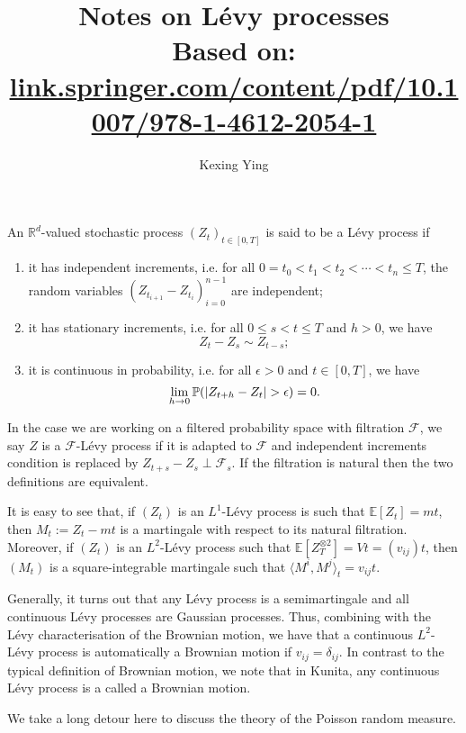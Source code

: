 \documentclass[]{article}
\title{Notes on L\'evy processes\\
  \large Based on: \href{link.springer.com/content/pdf/10.1007/978-1-4612-2054-1}{link.springer.com/content/pdf/10.1007/978-1-4612-2054-1}}
\author{Kexing Ying}
\theoremstyle{definition}
\theoremstyle{definition}
\begin{document}
\maketitle

An \(\mathbb{R}^d\)-valued stochastic process \((Z_t)_{t \in [0, T]}\) is said to be a L\'evy process 
if 
\begin{enumerate}
  \item it has independent increments, i.e. for all \(0 = t_0 < t_1 < t_2 < \cdots < t_n \leq T\), the 
    random variables \((Z_{t_{i + 1}} - Z_{t_i})_{i = 0}^{n - 1}\) are independent;
  \item it has stationary increments, i.e. for all \(0 \leq s < t \leq T\) and \(h > 0\), we have 
    \[Z_{t} - Z_{s} \sim Z_{t - s};\]
  \item it is continuous in probability, i.e. for all \(\epsilon > 0\) and \(t \in [0, T]\), we have 
    \[\lim_{h \to 0} \mathbb{P}(\abs{Z_{t + h} - Z_t} > \epsilon) = 0.\]
\end{enumerate}

In the case we are working on a filtered probability space with filtration \(\mathcal{F}\), we say \(Z\) is 
a \(\mathcal{F}\)-L\'evy process if it is adapted to \(\mathcal{F}\) and independent increments condition is replaced by 
\(Z_{t + s} - Z_s \perp \mathcal{F}_s\). If the filtration is natural then the two definitions are equivalent.

It is easy to see that, if \((Z_t)\) is an \(L^1\)-L\'evy process is such that \(\mathbb{E}[Z_t] = mt\), 
then \(M_t := Z_t - mt\) is a martingale with respect to its natural filtration. Moreover, if \((Z_t)\) is  
an \(L^2\)-L\'evy process such that \(\mathbb{E}[Z_T^{\otimes 2}] = Vt = (v_{ij}) t\), then \((M_t)\) is a 
square-integrable martingale such that \(\langle M^i, M^j\rangle_t = v_{ij}t\). 

Generally, it turns out that any L\'evy process is a semimartingale and all continuous L\'evy processes 
are Gaussian processes. Thus, combining with the L\'evy characterisation of the Brownian motion, we have 
that a continuous \(L^2\)-L\'evy process is automatically a Brownian motion if \(v_{ij} = \delta_{ij}\).
In contrast to the typical definition of Brownian motion, we note that in Kunita, any continuous 
L\'evy process is a called a Brownian motion.

We take a long detour here to discuss the theory of the Poisson random measure.
\end{document}
